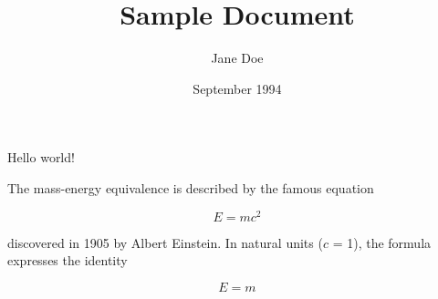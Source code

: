 \documentclass{article}
\title{Sample Document}
\author{Jane Doe}
\date{September 1994}
\begin{document}
   \maketitle
   Hello world!
   
   
   \vfill
   The mass-energy equivalence is described by the famous equation
 
$$E=mc^2$$
 
\noindent discovered in 1905 by Albert Einstein. 
In natural units ($c$ = 1), the formula expresses the identity
 
\begin{equation}
E=m
\end{equation}
\end{document}
